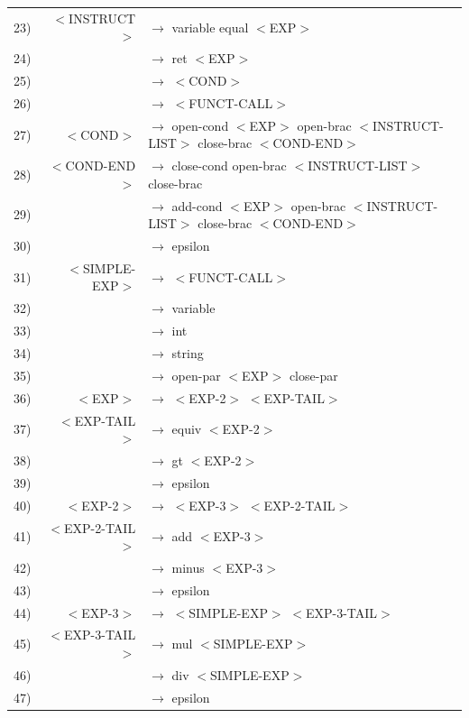 \documentclass[a4paper,10pt]{article}
\begin{document}
\begin{tabular}{rrl}
23)&	$<$INSTRUCT$>$				& $\rightarrow$ variable equal $<$EXP$>$ \\
24)&								& $\rightarrow$ ret $<$EXP$>$ \\
25)&								& $\rightarrow$ $<$COND$>$ \\
26)&								& $\rightarrow$ $<$FUNCT-CALL$>$ \\
27)&	$<$COND$>$					& $\rightarrow$ open-cond $<$EXP$>$ open-brac $<$INSTRUCT-LIST$>$ close-brac $<$COND-END$>$ \\
28)&	$<$COND-END$>$				& $\rightarrow$ close-cond open-brac $<$INSTRUCT-LIST$>$ close-brac \\
29)&								& $\rightarrow$ add-cond $<$EXP$>$ open-brac $<$INSTRUCT-LIST$>$ close-brac $<$COND-END$>$ \\
30)&								& $\rightarrow$ epsilon \\
31)&	$<$SIMPLE-EXP$>$			& $\rightarrow$ $<$FUNCT-CALL$>$ \\
32)&								& $\rightarrow$ variable \\
33)&								& $\rightarrow$ int \\
34)&								& $\rightarrow$ string \\
35)&								& $\rightarrow$ open-par $<$EXP$>$ close-par \\
36)&	$<$EXP$>$					& $\rightarrow$ $<$EXP-2$>$ $<$EXP-TAIL$>$ \\
37)&	$<$EXP-TAIL$>$				& $\rightarrow$ equiv $<$EXP-2$>$   \\
38)&								& $\rightarrow$ gt $<$EXP-2$>$   \\
39)&								& $\rightarrow$ epsilon \\
40)&	$<$EXP-2$>$					& $\rightarrow$ $<$EXP-3$>$ $<$EXP-2-TAIL$>$ \\
41)&	$<$EXP-2-TAIL$>$			& $\rightarrow$ add $<$EXP-3$>$   \\
42)&								& $\rightarrow$ minus $<$EXP-3$>$  \\
43)&								& $\rightarrow$ epsilon \\
44)&	$<$EXP-3$>$					& $\rightarrow$ $<$SIMPLE-EXP$>$ $<$EXP-3-TAIL$>$ \\
45)&	$<$EXP-3-TAIL$>$			& $\rightarrow$ mul $<$SIMPLE-EXP$>$  \\
46)&								& $\rightarrow$ div $<$SIMPLE-EXP$>$   \\
47)&								& $\rightarrow$ epsilon \\
					
					
\end{tabular}
\end{document}
